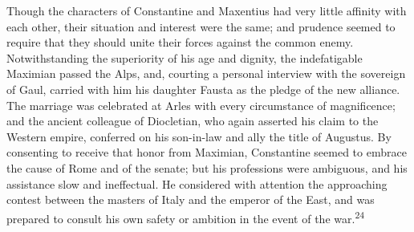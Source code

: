 Though the characters of Constantine and Maxentius had very
little affinity with each other, their situation and interest
were the same; and prudence seemed to require that they should
unite their forces against the common enemy. Notwithstanding the
superiority of his age and dignity, the indefatigable Maximian
passed the Alps, and, courting a personal interview with the
sovereign of Gaul, carried with him his daughter Fausta as the
pledge of the new alliance. The marriage was celebrated at Arles
with every circumstance of magnificence; and the ancient
colleague of Diocletian, who again asserted his claim to the
Western empire, conferred on his son-in-law and ally the title of
Augustus. By consenting to receive that honor from Maximian,
Constantine seemed to embrace the cause of Rome and of the
senate; but his professions were ambiguous, and his assistance
slow and ineffectual. He considered with attention the
approaching contest between the masters of Italy and the emperor
of the East, and was prepared to consult his own safety or
ambition in the event of the war.\textsuperscript{24}



